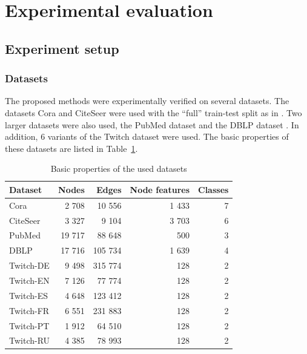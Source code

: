 \section{Experimental evaluation}\label{sec:experimental-evaluation}

\subsection{Experiment setup}

\subsubsection{Datasets}

The proposed methods were experimentally verified on several datasets. The datasets Cora and CiteSeer \cite{yang_revisiting_2016} were used with the \enquote{full} train-test split as in \cite{chen_fastgcn_2018}. Two larger datasets were also used, the PubMed dataset \cite{yang_revisiting_2016} and the DBLP dataset \cite{bojchevski_deep_2018}. In addition, 6 variants of the Twitch dataset \cite{rozemberczki_multi-scale_2021} were used. The basic properties of these datasets are listed in Table~\ref{tab:dataset-sizes}.

\begin{table}
  \caption{Basic properties of the used datasets}
  \label{tab:dataset-sizes}
  \centering
  \begin{tabular}{lrrrr}
    \toprule
    \textbf{Dataset} & \textbf{Nodes} & \textbf{Edges} & \textbf{Node features} & \textbf{Classes} \\
    \midrule
    Cora             & 2 708          & 10 556         & 1 433                  & 7                \\
    CiteSeer         & 3 327          & 9 104          & 3 703                  & 6                \\
    PubMed           & 19 717         & 88 648         & 500                    & 3                \\
    DBLP             & 17 716         & 105 734        & 1 639                  & 4                \\
    Twitch-DE        & 9 498          & 315 774        & 128                    & 2                \\
    Twitch-EN        & 7 126          & 77 774         & 128                    & 2                \\
    Twitch-ES        & 4 648          & 123 412        & 128                    & 2                \\
    Twitch-FR        & 6 551          & 231 883        & 128                    & 2                \\
    Twitch-PT        & 1 912          & 64 510         & 128                    & 2                \\
    Twitch-RU        & 4 385          & 78 993         & 128                    & 2                \\
    \bottomrule
  \end{tabular}
\end{table}

